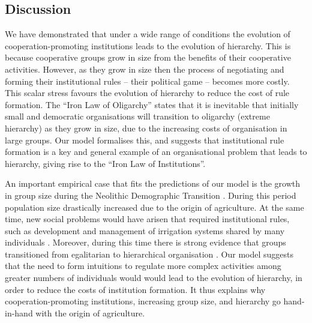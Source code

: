 \documentclass{rstb}
\begin{document}
\begin{linenumbers}
\section*{Discussion}
We have demonstrated that under a wide range of conditions the evolution of cooperation-promoting institutions leads to the evolution of hierarchy. This is because cooperative groups grow in size from the benefits of their cooperative activities. However, as they grow in size then the process of negotiating and forming their institutional rules -- their political game -- becomes more costly. This scalar stress \cite{Johnson:1982:a} favours the evolution of hierarchy to reduce the cost of rule formation. The ``Iron Law of Oligarchy'' \cite{Michels:1911:a} states that it is inevitable that initially small and democratic organisations will transition to oligarchy (extreme hierarchy) as they grow in size, due to the increasing costs of organisation in large groups. Our model formalises this, and suggests that institutional rule formation is a key and general example of an organisational problem that leads to hierarchy, giving rise to the ``Iron Law of Institutions''.

An important empirical case that fits the predictions of our model is the growth in group size during the Neolithic Demographic Transition \cite{Bocquet-Appel:2011:a}. During this period population size drastically increased due to the origin of agriculture. At the same time, new social problems would have arisen that required institutional rules, such as development and management of irrigation systems shared by many individuals \cite{Hunt:1988:a,Trawick:2001:a,Janssen:2012:a,Carballo:2014:a}. Moreover, during this time there is strong evidence that groups transitioned from egalitarian to hierarchical organisation  \cite{Boehm:1999:a,Price:1995:a,Price:2010:a}. Our model suggests that the need to form intuitions to regulate more complex activities among greater numbers of individuals would would lead to the evolution of hierarchy, in order to reduce the costs of institution formation. It thus explains why cooperation-promoting institutions, increasing group size, and hierarchy go hand-in-hand with the origin of agriculture. 


\end{linenumbers}
\end{document}
